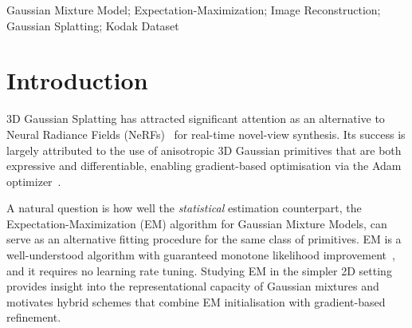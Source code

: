 \documentclass[a4paper,conference]{IEEEtran}
\begin{document}
\begin{IEEEkeywords}
Gaussian Mixture Model; Expectation-Maximization; Image Reconstruction;
Gaussian Splatting; Kodak Dataset
\end{IEEEkeywords}

\IEEEpeerreviewmaketitle

\section{Introduction}
\label{sec:intro}

3D Gaussian Splatting \cite{kerbl3Dgaussians} has attracted significant
attention as an alternative to Neural Radiance Fields (NeRFs)~\cite{mildenhall2020nerf}
for real-time novel-view synthesis.
Its success is largely attributed to the use of anisotropic 3D Gaussian
primitives that are both expressive and differentiable, enabling gradient-based
optimisation via the Adam optimizer~\cite{kingma2017adam}.

A natural question is how well the \emph{statistical} estimation
counterpart, the Expectation-Maximization (EM) algorithm for Gaussian Mixture
Models, can serve as an alternative fitting procedure for the same class of
primitives.
EM is a well-understood algorithm with guaranteed monotone likelihood
improvement~\cite{dempster1977em}, and it requires no learning rate tuning.
Studying EM in the simpler 2D setting provides insight into the representational
capacity of Gaussian mixtures and motivates hybrid schemes that combine EM
initialisation with gradient-based refinement.
\end{document}
